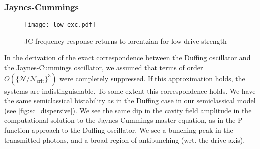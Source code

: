 \subsubsection{Jaynes-Cummings}
\begin{figure}[bht]
  \centering
  \texttt{[image: low\_exc.pdf]}
  \caption{JC frequency response returns to lorentzian for low drive strength}
  \label{low_exc}
\end{figure}
In the derivation of the exact correspondence between the Duffing oscillator and the Jaynes-Cummings oscillator, we assumed that terms of order $O(\{\mathscr{N}/\mathscr{N}_\text{crit}\}^3)$ were completely suppressed. 
If this approximation holds, the systems are indistinguishable. 
To some extent this correspondence holds. 
We have the same semiclassical bistability as in the Duffing case in our semiclassical model (see \cref{fig:sc_dispersive}).
We see the same dip in the cavity field amplitude in the computational solution to the Jaynes-Cummings master equation, as in the P function approach to the Duffing oscillator. 
We see a bunching peak in the transmitted photons, and a broad region of antibunching (wrt. the drive axis). 

